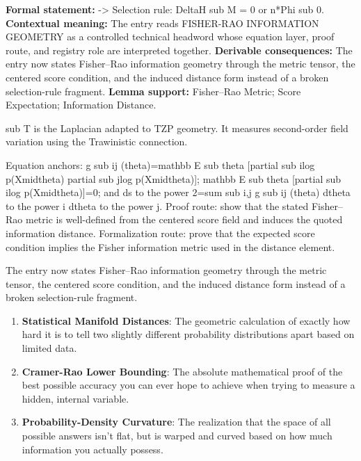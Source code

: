 \begingroup\footnotesize\setlength{\emergencystretch}{3em}\sloppy
\textbf{Formal statement:} -> Selection rule: DeltaH sub M = 0 or n*Phi sub 0. \textbf{Contextual meaning:} The entry reads FISHER-RAO INFORMATION GEOMETRY as a controlled technical headword whose equation layer, proof route, and registry role are interpreted together. \textbf{Derivable consequences:} The entry now states Fisher--Rao information geometry through the metric tensor, the centered score condition, and the induced distance form instead of a broken selection-rule fragment. \textbf{Lemma support:} Fisher--Rao Metric; Score Expectation; Information Distance.\par
\endgroup

sub T is the Laplacian adapted to TZP geometry. It measures second-order field variation using the Trawinistic connection.

Equation anchors: g sub ij (theta)=mathbb E sub theta [partial sub ilog p(Xmidtheta) partial sub jlog p(Xmidtheta)]; mathbb E sub theta [partial sub ilog p(Xmidtheta)]=0; and ds to the power 2=sum sub i,j g sub ij (theta) dtheta to the power i dtheta to the power j. Proof route: show that the stated Fisher--Rao metric is well-defined from the centered score field and induces the quoted information distance. Formalization route: prove that the expected score condition implies the Fisher information metric used in the distance element.

The entry now states Fisher--Rao information geometry through the metric tensor, the centered score condition, and the induced distance form instead of a broken selection-rule fragment.
\endgroup

\begin{enumerate}[leftmargin=1.6em,itemsep=6pt,topsep=4pt]
\item \textbf{Statistical Manifold Distances}: The geometric calculation of exactly how hard it is to tell two slightly different probability distributions apart based on limited data.
\item \textbf{Cramer-Rao Lower Bounding}: The absolute mathematical proof of the best possible accuracy you can ever hope to achieve when trying to measure a hidden, internal variable.
\item \textbf{Probability-Density Curvature}: The realization that the space of all possible answers isn't flat, but is warped and curved based on how much information you actually possess.
\end{enumerate}

